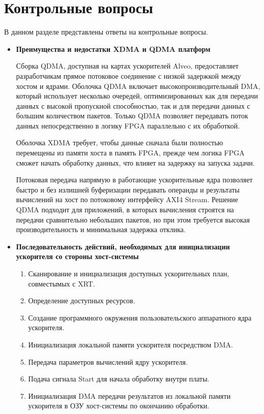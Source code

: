 \chapter{Контрольные вопросы}

В данном разделе представлены ответы на контрольные вопросы.

\noindent
\begin{itemize}[left=-0.5\parindent]
    \item \textbf{Преимущества и недостатки XDMA и QDMA платформ}

        Сборка QDMA, доступная на картах ускорителей Alveo, предоставляет
        разработчикам прямое потоковое соединение с низкой задержкой между
        хостом и ядрами. Оболочка QDMA включает высокопроизводительный DMA,
        который использует несколько очередей, оптимизированных как для
        передачи данных с высокой пропускной способностью, так и для передачи
        данных с большим количеством пакетов.  Только QDMA позволяет передавать
        поток данных непосредственно в логику FPGA параллельно с их обработкой.

        Оболочка XDMA требует, чтобы данные сначала были полностью перемещены
        из памяти хоста в память FPGA, прежде чем логика FPGA сможет начать
        обработку данных, что влияет на задержку на запуска задачи.

        Потоковая передача напрямую в работающие ускорительные ядра позволяет
        быстро и без излишней буферизации передавать операнды и результаты
        вычислений на хост по потоковому интерфейсу AXI4 Stream. Решение QDMA
        подходит для приложений, в которых вычисления строятся на передачи
        сравнительно небольших пакетов, но при этом требуется высокая
        производительность и минимальная задержка отклика.
        ~\\

    \item \textbf{Последовательность действий, необходимых для инициализации
        ускорителя со стороны хост-системы}
        \begin{enumerate}[leftmargin=\parindent]
            \item Сканирование и инициализация доступных ускорительных план,
                  совместымых с XRT.
            \item Определение доступных ресурсов.
            \item Создание программного окружения пользовательского аппаратного
                  ядра ускорителя.
            \item Инициализация локальной памяти ускорителя посредством DMA.
            \item Передача параметров вычислений ядру ускорителя.
            \item Подача сигнала Start для начала обработку внутри платы.
            \item Инициализация DMA передачи результатов из локальной памяти
                  ускорителя в ОЗУ хост-системы по окончанию обработки.
        \end{enumerate}
        ~\\


\end{itemize}

